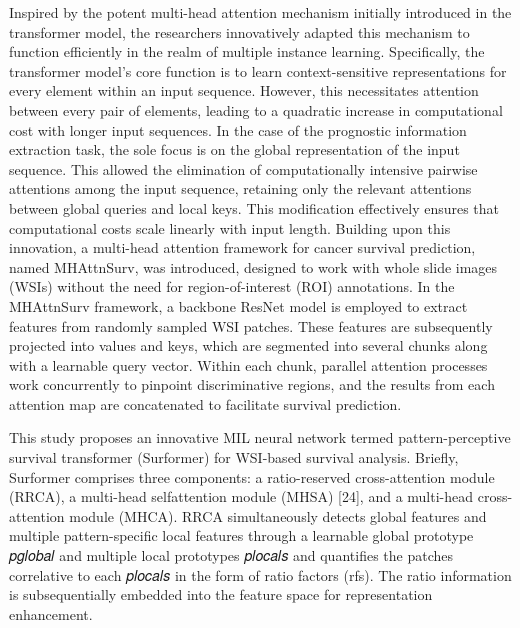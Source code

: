 \documentclass[journal,twoside,web]{ieeecolor}
\begin{document}
Inspired by the potent multi-head attention mechanism initially introduced in the transformer\cite{jiang2023mhattnsurv} model, the researchers innovatively adapted this mechanism to function efficiently in the realm of multiple instance learning. Specifically, the transformer model's core function is to learn context-sensitive representations for every element within an input sequence. However, this necessitates attention between every pair of elements, leading to a quadratic increase in computational cost with longer input sequences. In the case of the prognostic information extraction task, the sole focus is on the global representation of the input sequence. This allowed the elimination of computationally intensive pairwise attentions among the input sequence, retaining only the relevant attentions between global queries and local keys. This modification effectively ensures that computational costs scale linearly with input length. Building upon this innovation, a multi-head attention framework for cancer survival prediction, named MHAttnSurv, was introduced, designed to work with whole slide images (WSIs) without the need for region-of-interest (ROI) annotations. In the MHAttnSurv framework, a backbone ResNet model is employed to extract features from randomly sampled WSI patches. These features are subsequently projected into values and keys, which are segmented into several chunks along with a learnable query vector. Within each chunk, parallel attention processes work concurrently to pinpoint discriminative regions, and the results from each attention map are concatenated to facilitate survival prediction.

This study proposes an innovative MIL neural network termed pattern-perceptive survival transformer (Surformer) for WSI-based survival analysis. Briefly, Surformer comprises three components: a ratio-reserved cross-attention module (RRCA), a multi-head selfattention module (MHSA) [24], and a multi-head cross-attention module (MHCA). RRCA simultaneously detects global features and multiple pattern-specific local features through a learnable global prototype 𝑝𝑔𝑙𝑜𝑏𝑎𝑙 and multiple local prototypes 𝑝𝑙𝑜𝑐𝑎𝑙𝑠 and quantifies the patches correlative to each 𝑝𝑙𝑜𝑐𝑎𝑙𝑠 in the form of ratio factors (rfs). The ratio information is subsequentially embedded into the feature space for representation enhancement. 



\end{document}
